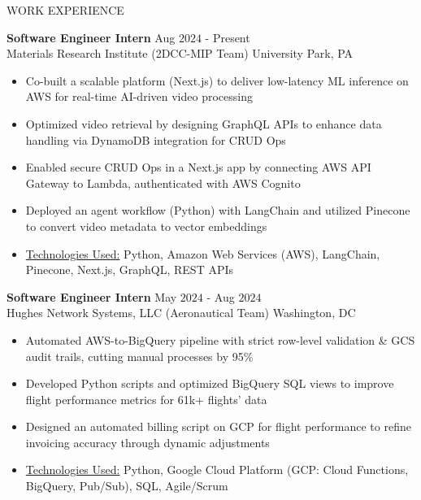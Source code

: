 \documentclass{resume} %
\begin{document}
\begin{rSection}{WORK EXPERIENCE}

{\bf Software Engineer Intern} \hfill Aug $2024$ - Present\\
Materials Research Institute (2DCC-MIP Team) \hfill University Park, PA
\begin{itemize}[itemsep = -4pt]
    \item Co-built a scalable platform (Next.js) to deliver low-latency ML inference on AWS for real-time AI-driven video processing
    \item Optimized video retrieval by designing GraphQL APIs to enhance data handling via DynamoDB integration for CRUD Ops
    \item Enabled secure CRUD Ops in a Next.js app by connecting AWS API Gateway to Lambda, authenticated with AWS Cognito
    \item Deployed an agent workflow (Python) with LangChain and utilized Pinecone to convert video metadata to vector embeddings
    \item \underline{Technologies Used:} Python, Amazon Web Services (AWS), LangChain, Pinecone, Next.js, GraphQL, REST APIs
\end{itemize}

{\bf Software Engineer Intern} \hfill May $2024$ - Aug $2024$\\
Hughes Network Systems, LLC (Aeronautical Team) \hfill Washington, DC
\begin{itemize}[itemsep = -4pt]
    \item Automated AWS-to-BigQuery pipeline with strict row-level validation \& GCS audit trails, cutting manual processes by 95\%
    \item Developed Python scripts and optimized BigQuery SQL views to improve flight performance metrics for 61k+ flights' data
    \item Designed an automated billing script on GCP for flight performance to refine invoicing accuracy through dynamic adjustments
    \item \underline{Technologies Used:} Python, Google Cloud Platform (GCP: Cloud Functions, BigQuery, Pub/Sub), SQL, Agile/Scrum
\end{itemize}


\end{rSection}
\end{document}
